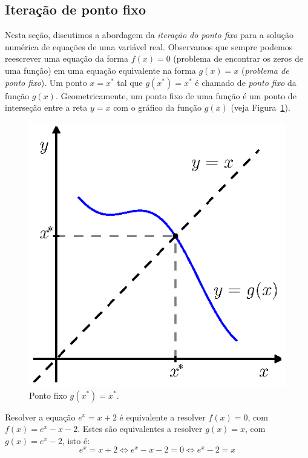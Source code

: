 \begin{ex}
\section{Iteração de ponto fixo}

Nesta seção, discutimos a abordagem da \emph{iteração do ponto fixo} para a solução numérica de equações de uma variável real. Observamos que sempre podemos reescrever uma equação da forma $f(x) = 0$ (problema de encontrar os zeros de uma função) em uma equação equivalente na forma $g(x) = x$ (\emph{problema de ponto fixo}). Um ponto $x = x^*$ tal que $g(x^*) = x^*$ é chamado de \emph{ponto fixo} da função $g(x)$. Geometricamente, um ponto fixo de uma função é um ponto de interseção entre a reta $y = x$ com o gráfico da função $g(x)$ (veja Figura~\ref{fig:defn_ponto_fixo}).

\begin{figure}[h]
  \centering
  \includegraphics{./cap_equacao1d/pics/defn_ponto_fixo/defn_ponto_fixo.eps}
  \caption{Ponto fixo $g(x^*) = x^*$.}
  \label{fig:defn_ponto_fixo}
\end{figure}

\begin{ex}\label{ex:ponto_fixo_1}
  Resolver a equação $e^x = x + 2$ é equivalente a resolver $f(x) = 0$, com $f(x) = e^x - x - 2$. Estes são equivalentes a resolver $g(x) = x$, com $g(x) = e^x - 2$, isto é:
  \begin{equation}
    e^x = x + 2 \Leftrightarrow e^x - x - 2 = 0 \Leftrightarrow e^x - 2 = x
  \end{equation}
\end{ex}


\end{ex}
